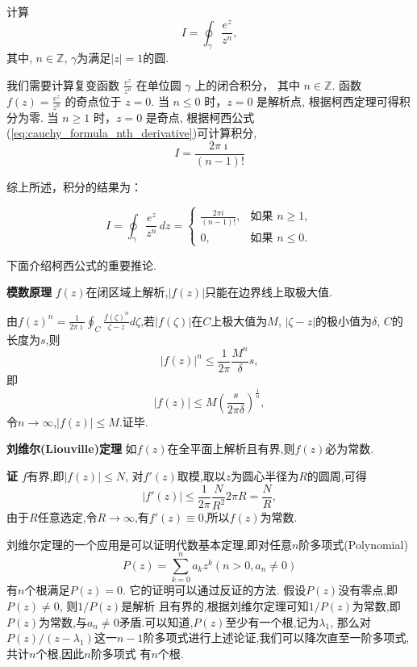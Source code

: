 \begin{example}
    计算 
    $$
    I = \oint_\gamma \frac{e^z}{z^n}, 
    $$
    其中, $n\in \mathbb{Z}$, $\gamma$为满足$|z| = 1$的圆.
\end{example}
\begin{solution}
    我们需要计算复变函数 \( \frac{e^z}{z^n} \) 在单位圆 \( \gamma \) 上的闭合积分，
    其中 \( n \in \mathbb{Z} \).
函数 \( f(z) = \frac{e^z}{z^n} \) 的奇点位于 \( z = 0 \).
当 \( n \leq 0 \) 时，\( z = 0 \) 是解析点, 根据柯西定理可得积分为零.
当 \( n \geq 1 \) 时，\( z = 0 \) 是奇点, 根据柯西公式(\ref{eq:cauchy_formula_nth_derivative})可计算积分,
$$ I = \frac{2 \pi \imath }{(n-1)!}$$

综上所述，积分的结果为：

\[
I = \oint_\gamma \frac{e^z}{z^n} \, dz =
\begin{cases}
\frac{2\pi i}{(n-1)!}, & \text{如果 } n \geq 1, \\
0, & \text{如果 } n \leq 0.
\end{cases}
\]

\end{solution}


下面介绍柯西公式的重要推论.

\textbf{模数原理} $f(z)$在闭区域上解析,$|f(z)|$只能在边界线上取极大值.

由$f(z)^n = \frac{1}{2\pi \imath} \oint_C \frac{f(\zeta)^n}{\zeta - z} d \zeta$,若$|f(\zeta)|$在$C$上极大值为$M$,
$|\zeta - z|$的极小值为$\delta$, $C$的长度为$s$,则
\[
  |f(z)|^n \leq \frac{1}{2\pi} \frac{M^n}{\delta} s  ,
\]
即
\[
    |f(z)| \leq M \left( \frac{s}{2\pi \delta} \right)^{\frac{1}{n}},
\]
令$n\to \infty$,$|f(z)| \leq M$.证毕.

\textbf{刘维尔(Liouville)定理} \quad 如$f(z)$在全平面上解析且有界,则$f(z)$必为常数.

\textbf{证} \quad $f$有界,即$|f(z)| \leq N$, 对$f'(z)$取模,取以$z$为圆心半径为$R$的圆周,可得
\[
  |f'(z)| \leq \frac{1}{2\pi} \frac{N} {R^2} 2\pi R = \frac{N}{R},
\]
由于$R$任意选定,令$R\to \infty$,有$f'(z) \equiv 0$,所以$f(z)$为常数.

刘维尔定理的一个应用是可以证明代数基本定理,即对任意$n$阶多项式(Polynomial)
\begin{equation}
    P(z) = \sum_{k=0}^{n} a_k z^k (n>0, a_n \neq 0)
    \label{eq:poly}
\end{equation}
有$n$个根满足$P(z) = 0$. 它的证明可以通过反证的方法. 假设$P(z)$没有零点,即$P(z)\neq 0$, 则$1/P(z)$是解析
且有界的,根据刘维尔定理可知$1/P(z)$为常数,即$P(z)$为常数,与$a_n\neq 0$矛盾.可以知道,$P(z)$至少有一个根,记为$\lambda_1$,
那么对$P(z)/(z-\lambda_1)$这一$n-1$阶多项式进行上述论证,我们可以降次直至一阶多项式,共计$n$个根,因此$n$阶多项式
有$n$个根.


